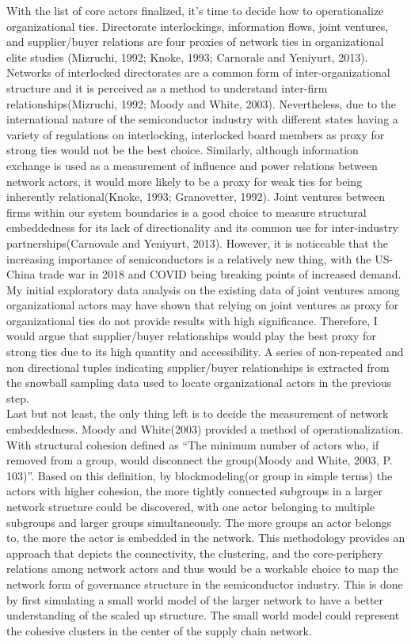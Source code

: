 \documentclass[12pt]{article}
\begin{document}
\indent With the list of core actors finalized, it’s time to decide how to operationalize organizational ties. Directorate interlockings, information flows, joint ventures, and supplier/buyer relations are four proxies of network ties in organizational elite studies (Mizruchi, 1992; Knoke, 1993; Carnorale and Yeniyurt, 2013). Networks of interlocked directorates are a common form of inter-organizational structure and it is perceived as a method to understand inter-firm relationships(Mizruchi, 1992; Moody and White, 2003). Nevertheless, due to the international nature of the semiconductor industry with different states having a variety of regulations on interlocking, interlocked board members as proxy for strong ties would not be the best choice. Similarly, although information exchange is used as a measurement of influence and power relations between network actors, it would more likely to be a proxy for weak ties for being inherently relational(Knoke, 1993; Granovetter, 1992). Joint ventures between firms within our system boundaries is a good choice to measure structural embeddedness for its lack of directionality and its common use for inter-industry partnerships(Carnovale and Yeniyurt, 2013). However, it is noticeable that the increasing importance of semiconductors is a relatively new thing, with the US-China trade war in 2018 and COVID being breaking points of increased demand. My initial exploratory data analysis on the existing data of joint ventures among organizational actors may have shown that relying on joint ventures as proxy for organizational ties do not provide results with high significance. Therefore, I would argue that supplier/buyer relationships would play the best proxy for strong ties due to its high quantity and accessibility. A series of non-repeated and non directional tuples indicating supplier/buyer relationships is extracted from the snowball sampling data used to locate organizational actors in the previous step. \\
\indent Last but not least, the only thing left is to decide the measurement of network embeddedness. Moody and White(2003) provided a method of operationalization. With structural cohesion defined as “The minimum number of actors who, if removed from a group, would disconnect the group(Moody and White, 2003, P. 103)”. Based on this definition, by blockmodeling(or group in simple terms) the actors with higher cohesion, the more tightly connected subgroups in a larger network structure could be discovered, with one actor belonging to multiple subgroups and larger groups simultaneously. The more groups an actor belongs to, the more the actor is embedded in the network. This methodology provides an approach that depicts the connectivity, the clustering, and the core-periphery relations among network actors and thus would be a workable choice to map the network form of governance structure in the semiconductor industry. This is done by first simulating a small world model of the larger network to have a better understanding of the scaled up structure. The small world model could represent the cohesive clusters in the center of the supply chain network.
\end{document}
